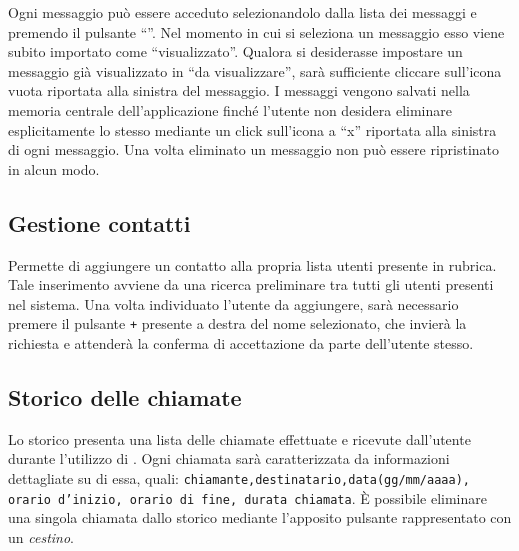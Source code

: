 Ogni messaggio può essere acceduto selezionandolo dalla lista dei messaggi e premendo il pulsante ``''. Nel momento in cui si seleziona un messaggio esso viene subito importato come ``visualizzato''. Qualora si desiderasse impostare un messaggio già visualizzato in ``da visualizzare'', sarà sufficiente cliccare sull'icona vuota riportata alla sinistra del messaggio.
I messaggi vengono salvati nella memoria centrale dell'applicazione \caName{} finché l'utente non desidera eliminare esplicitamente lo stesso mediante un click sull'icona a ``x'' riportata alla sinistra di ogni messaggio. Una volta eliminato un messaggio non può essere ripristinato in alcun modo.



\subsection{Gestione contatti}
Permette di aggiungere un contatto alla propria lista utenti presente in rubrica. Tale inserimento avviene da una ricerca preliminare tra tutti gli utenti presenti nel sistema. Una volta individuato l'utente da aggiungere, sarà necessario premere il pulsante \texttt{+} presente a destra del nome selezionato, che invierà la richiesta e attenderà la conferma di accettazione da parte dell'utente stesso.



\subsection{Storico delle chiamate}
Lo storico presenta una lista delle chiamate effettuate e ricevute dall'utente durante l'utilizzo di \caName{}. Ogni chiamata sarà caratterizzata da informazioni dettagliate su di essa, quali: \texttt{chiamante,destinatario,data(gg/mm/aaaa), orario d'inizio, orario di fine, durata chiamata}.
È possibile eliminare una singola chiamata dallo storico mediante l'apposito pulsante rappresentato con un \textit{cestino}.




